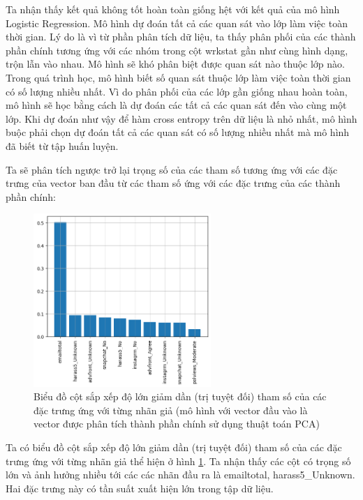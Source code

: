 \begin{enumerate}[label=(\alph*)]
    Ta nhận thấy kết quả không tốt hoàn toàn giống hệt với kết quả của mô hình Logistic Regression.
    Mô hình dự đoán tất cả các quan sát vào lớp làm việc toàn thời gian.
    Lý do là vì từ phần phân tích dữ liệu, ta thấy phân phối của các thành phần chính tương ứng với các nhóm trong cột wrkstat gần như cùng hình dạng, trộn lẫn vào nhau.
    Mô hình sẽ khó phân biệt được quan sát nào thuộc lớp nào.
    Trong quá trình học, mô hình biết số quan sát thuộc lớp làm việc toàn thời gian có số lượng nhiều nhất.
    Vì do phân phối của các lớp gần giống nhau hoàn toàn, mô hình sẽ học bằng cách là dự đoán các tất cả các quan sát đến vào cùng một lớp.
    Khi dự đoán như vậy để hàm cross entropy trên dữ liệu là nhỏ nhất, mô hình buộc phải chọn dự đoán tất cả các quan sát có số lượng nhiều nhất mà mô hình đã biết từ tập huấn luyện.

    Ta sẽ phân tích ngược trở lại trọng số của các tham số tương ứng với các đặc trưng của vector ban đầu từ các tham số ứng với các đặc trưng của các thành phần chính:

    \begin{figure}[H]
        \centering
        \includegraphics[width=0.6\textwidth]{figures/Thanh/Models/Random_Forest/Non_null_models_Feature_Importance_Random_Forest_PCA_features.png}
        \caption{Biểu đồ cột sắp xếp độ lớn giảm dần (trị tuyệt đối) tham số của các đặc trưng ứng với từng nhãn giả (mô hình với vector đầu vào là vector được phân tích thành phần chính sử dụng thuật toán PCA)}
        \label{fig:Non_null_models_Feature_Importance_Random_Forest_PCA_features}
    \end{figure}
    
    Ta có biểu đồ cột sắp xếp độ lớn giảm dần (trị tuyệt đối) tham số của các đặc trưng ứng với từng nhãn giả thể hiện ở hình \ref{fig:Non_null_models_Feature_Importance_Random_Forest_PCA_features}.
    Ta nhận thấy các cột có trọng số lớn và ảnh hưởng nhiều tới các các nhãn đầu ra là emailtotal, harass5\_Unknown.
    Hai đặc trưng này có tần suất xuất hiện lớn trong tập dữ liệu.


\end{enumerate}
